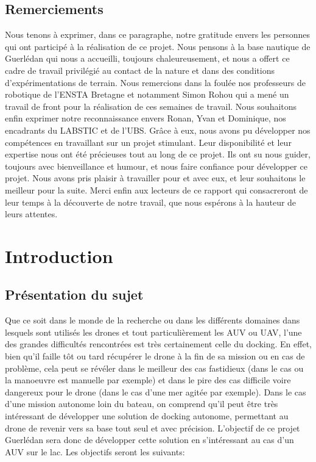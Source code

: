 \documentclass[12pt]{report}
\begin{document}


\tableofcontents

\newpage
\section*{\centering Remerciements}
Nous tenons à exprimer, dans ce paragraphe, notre gratitude envers les personnes qui ont participé à la réalisation de ce projet. 
Nous pensons à la base nautique de Guerlédan qui nous a accueilli, toujours chaleureusement, et nous a offert ce cadre de travail privilégié au contact de la nature et dans des conditions d'expérimentations de terrain.
Nous remercions dans la foulée nos professeurs de robotique de l'ENSTA Bretagne et notamment Simon Rohou qui a mené un travail de front pour la réalisation de ces semaines de travail.
Nous souhaitons enfin exprimer notre reconnaissance envers Ronan, Yvan et Dominique, nos encadrants du LABSTIC et de l'UBS. Grâce à eux, nous avons pu développer nos compétences en travaillant sur 
un projet stimulant. Leur disponibilité et leur expertise nous ont été précieuses tout au long de ce projet. Ils ont su nous guider, toujours avec bienveillance et humour, et nous faire confiance pour développer ce projet.
Nous avons pris plaisir à travailler pour et avec eux, et leur souhaitons le meilleur pour la suite. Merci enfin aux lecteurs de ce rapport qui consacreront de leur temps à la découverte de notre travail, que nous espérons à la hauteur de leurs attentes.

\chapter{Introduction}

\section{Présentation du sujet}

Que ce soit dans le monde de la recherche ou dans les différents domaines dans lesquels sont utilisés les drones et tout particulièrement les AUV ou UAV, l'une des grandes difficultés rencontrées est très certainement celle du docking. En effet, bien qu'il faille tôt ou tard récupérer le drone à la fin de sa mission ou en cas de problème, cela peut se révéler dans le meilleur des cas fastidieux (dans le cas ou la manoeuvre est manuelle par exemple) et dans le pire des cas difficile voire dangereux pour le drone (dans le cas d'une mer agitée par exemple). Dans le cas d'une mission autonome loin du bateau, on comprend qu'il peut être très intéressant de développer une solution de docking autonome, permettant au drone de revenir vers sa base tout seul et avec précision. L'objectif de ce projet Guerlédan sera donc de développer cette solution en s'intéressant au cas d'un AUV sur le lac. Les objectifs seront les suivants:
\end{document}
